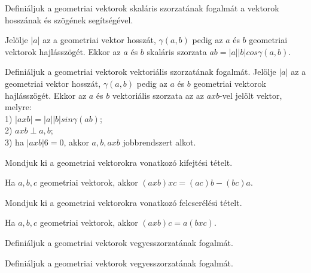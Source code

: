 \begin{frame}
  \begin{tcolorbox}[title={18}]
   Definiáljuk a geometriai vektorok skaláris szorzatának fogalmát a vektorok hosszának és szögének segítségével.

  \tcblower
Jelölje $|a|$ az a geometriai vektor hosszát, ${\gamma}(a,b)$ pedig az $a$ és $b$ geometriai vektorok hajlásszögét. Ekkor az $a$ és $b$ skaláris szorzata $ab = |a||b|cos{\gamma}(a,b)$.

  \end{tcolorbox}
\end{frame}


\begin{frame}
  \begin{tcolorbox}[title={19}]
   Definiáljuk a geometriai vektorok vektoriális szorzatának fogalmát.
  \tcblower
Jelölje $|a|$ az a geometriai vektor hosszát, ${\gamma}(a,b)$ pedig az $a$ és $b$ geometriai vektorok hajlásszögét. Ekkor az $a$ és $b$ vektoriális szorzata az az $a x b$-vel jelölt vektor, melyre:\\

1) $|a x b| = |a||b|sin{\gamma}(ab)$;\\
2) $a x b {\perp} a,b$;\\
3) ha $|a x b| 6= 0$, akkor $a,b,a x b$ jobbrendszert alkot.

  \end{tcolorbox}
\end{frame}


\begin{frame}
  \begin{tcolorbox}[title={20}]
    Mondjuk ki a geometriai vektorokra vonatkozó kifejtési tételt.

  \tcblower
Ha $a,b,c$ geometriai vektorok, akkor $(a x b) x c = (ac)b - (bc)a$.

  \end{tcolorbox}
\end{frame}


\begin{frame}
  \begin{tcolorbox}[title={21}]
    Mondjuk ki a geometriai vektorokra vonatkozó felcserélési tételt.

  \tcblower
    Ha $a,b,c$ geometriai vektorok, akkor $(a x b)c = a(b x c)$. 
  \end{tcolorbox}
\end{frame}


\begin{frame}
  \begin{tcolorbox}[title={22}]
    Definiáljuk a geometriai vektorok vegyesszorzatának fogalmát.

  \tcblower
 Definiáljuk a geometriai vektorok vegyesszorzatának fogalmát.

  \end{tcolorbox}
\end{frame}


